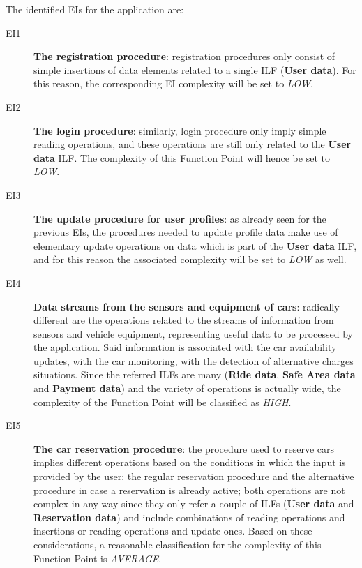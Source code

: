 The identified EIs for the application are:
\begin{description}
\item[EI1] \textbf{The registration procedure}: registration procedures only consist of simple insertions of data elements related to a single ILF (\textbf{User data}). For this reason, the corresponding EI complexity will be set to \textit{LOW}.
\item[EI2] \textbf{The login procedure}: similarly, login procedure only imply simple reading operations, and these operations are still only related to the \textbf{User data} ILF. The complexity of this Function Point will hence be set to \textit{LOW}. 
\item[EI3] \textbf{The update procedure for user profiles}: as already seen for the previous EIs, the procedures needed to update profile data make use of elementary update operations on data which is part of the \textbf{User data} ILF, and for this reason the associated complexity will be set to \textit{LOW} as well.
\item[EI4] \textbf{Data streams from the sensors and equipment of cars}: radically different are the operations related to the streams of information from sensors and vehicle equipment, representing useful data to be processed by the application. Said information is associated with the car availability updates, with the car monitoring, with the detection of alternative charges situations. Since the referred ILFs are many (\textbf{Ride data}, \textbf{Safe Area data} and \textbf{Payment data}) and the variety of operations is actually wide, the complexity of the Function Point will be classified as \textit{HIGH}.
\item[EI5] \textbf{The car reservation procedure}: the procedure used to reserve cars implies different operations based on the conditions in which the input is provided by the user: the regular reservation procedure and the alternative procedure in case a reservation is already active; both operations are not complex in any way since they only refer a couple of ILFs (\textbf{User data} and \textbf{Reservation data}) and include combinations of reading operations and insertions or reading operations and update ones. Based on these considerations, a reasonable classification for the complexity of this Function Point is \textit{AVERAGE}.

\end{description}
